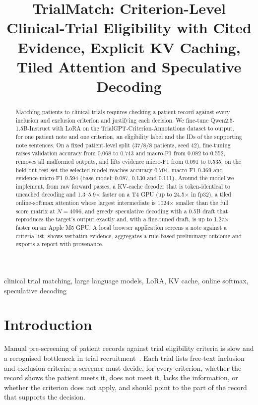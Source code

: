\documentclass[conference]{IEEEtran}
\begin{document}
\title{TrialMatch: Criterion-Level Clinical-Trial Eligibility with Cited Evidence, Explicit KV Caching, Tiled Attention and Speculative Decoding}

\author{
}

\maketitle

\begin{abstract}
Matching patients to clinical trials requires checking a patient record against every inclusion and exclusion criterion and justifying each decision. We fine-tune Qwen2.5-1.5B-Instruct with LoRA on the TrialGPT-Criterion-Annotations dataset to output, for one patient note and one criterion, an eligibility label and the IDs of the supporting note sentences. On a fixed patient-level split (37/8/8 patients, seed 42), fine-tuning raises validation accuracy from 0.068 to 0.743 and macro-F1 from 0.082 to 0.552, removes all malformed outputs, and lifts evidence micro-F1 from 0.091 to 0.535; on the held-out test set the selected model reaches accuracy 0.704, macro-F1 0.369 and evidence micro-F1 0.594 (base model: 0.087, 0.130 and 0.111). Around the model we implement, from raw forward passes, a KV-cache decoder that is token-identical to uncached decoding and 1.3--5.9$\times$ faster on a T4 GPU (up to 24.5$\times$ in fp32), a tiled online-softmax attention whose largest intermediate is 1024$\times$ smaller than the full score matrix at $N=4096$, and greedy speculative decoding with a 0.5B draft that reproduces the target's output exactly and, with a fine-tuned draft, is up to 1.27$\times$ faster on an Apple M5 GPU. A local browser application screens a note against a criteria list, shows verbatim evidence, aggregates a rule-based preliminary outcome and exports a report with provenance.
\end{abstract}

\begin{IEEEkeywords}
clinical trial matching, large language models, LoRA, KV cache, online softmax, speculative decoding
\end{IEEEkeywords}

\section{Introduction}
Manual pre-screening of patient records against trial eligibility criteria is slow and a recognised bottleneck in trial recruitment~\cite{jin2024trialgpt}. Each trial lists free-text inclusion and exclusion criteria; a screener must decide, for every criterion, whether the record shows the patient meets it, does not meet it, lacks the information, or whether the criterion does not apply, and should point to the part of the record that supports the decision.
\end{document}
